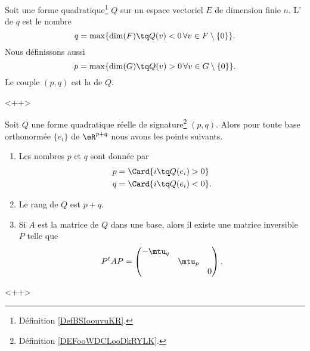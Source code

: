 \begin{definition}       \label{DEFooWDCLooDkRYLK}
    Soit une forme quadratique\footnote{Définition \ref{DefBSIoouvuKR}.} \( Q\) sur un espace vectoriel \( E\) de dimension finie \( n\). L' de \( q\) est le nombre
    \begin{equation}
        q=\max\{ \dim(F)\tq Q(v)<0\,\forall v\in F\setminus\{ 0 \} \}.
    \end{equation}
    Nous définissons aussi
    \begin{equation}
        p=\max\{ \dim(G)\tq Q(v)>0\,\forall v\in G\setminus\{ 0 \} \}.
    \end{equation}
    Le couple \( (p,q)\) est la  de \( Q\).
\end{definition}
<++>

\begin{theorem}   \label{ThoQFVsBCk}
    Soit $Q$ une forme quadratique réelle de signature\footnote{Définition \ref{DEFooWDCLooDkRYLK}.} \( (p,q)\). Alors pour toute base orthonormée \( \{ e_i \}\) de \( \eR^{p+q}\) nous avons les points suivants.
    \begin{enumerate}
        \item
            Les nombres \( p\) et \( q\) sont donnée par 
    \begin{subequations}
        \begin{align}
            p&=\Card\{ i\tq Q(e_i)>0 \}\\
            q&=\Card\{ i\tq Q(e_i)<0 \}.
        \end{align}
    \end{subequations}
\item
    Le rang de \( Q\) est \( p+q\).
\item
    Si \( A\) est la matrice de \( Q\) dans une base, alors il existe une matrice inversible \( P\) telle que
    \begin{equation}
        P^tAP=\begin{pmatrix}
            -\mtu_q    &       &       \\
                &   \mtu_p    &       \\
                &       &   0
        \end{pmatrix}.
    \end{equation}
    \end{enumerate}
    <++>
\end{theorem}

